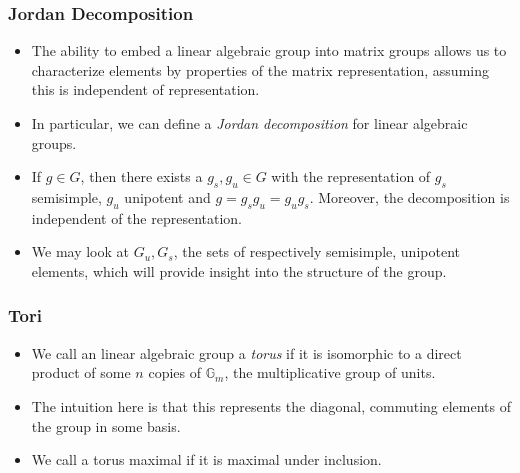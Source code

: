 \documentclass{beamer}
\theoremstyle{remark}
\begin{document}
\begin{frame}
  \frametitle{Jordan Decomposition} 

  \begin{itemize}
  \item The ability to embed a linear algebraic group into matrix groups allows us to characterize elements by properties of the matrix representation, assuming this is independent of representation.
    \pause
  \item In particular, we can define a \emph{Jordan decomposition} for linear algebraic groups.

    \pause
    \item If $g \in G$, then there exists a $g_s, g_u \in G$ with the representation of $g_s$ semisimple, $g_u$ unipotent and $g = g_s g_u = g_u g_s$. Moreover, the decomposition is independent of the representation.
    \pause
    \item We may look at $G_u, G_s$, the sets of respectively semisimple, unipotent elements, which will provide insight into the structure of the group.
  \end{itemize}
  
\end{frame}

\begin{frame}
  \frametitle{Tori} 

  \begin{itemize}
  \item We call an linear algebraic group a \emph{torus} if it is isomorphic to a direct product of some $n$ copies of $\mathbb{G}_m$, the multiplicative group of units.
  \pause
  \item The intuition here is that this represents the diagonal, commuting elements of the group in some basis.
  \pause
  \item We call a torus maximal if it is maximal under inclusion.
  \end{itemize}
\end{frame}
\end{document}
